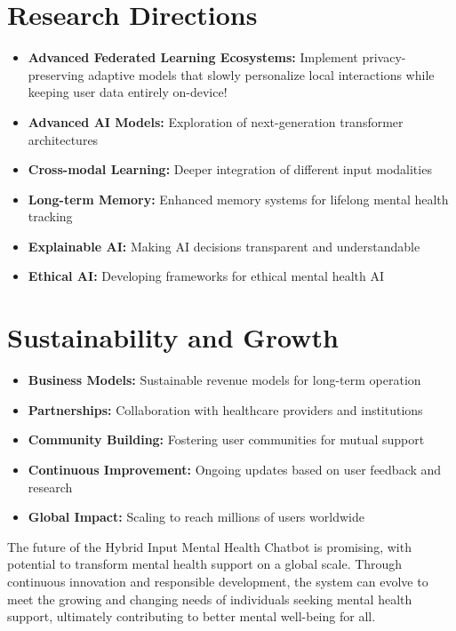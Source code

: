 \documentclass[11pt]{report}
\begin{document}
\section{Research Directions}
\begin{itemize}
    \item \textbf{Advanced Federated Learning Ecosystems:} Implement privacy-preserving adaptive models that slowly personalize local interactions while keeping user data entirely on-device!
    \item \textbf{Advanced AI Models:} Exploration of next-generation transformer architectures
    \item \textbf{Cross-modal Learning:} Deeper integration of different input modalities
    \item \textbf{Long-term Memory:} Enhanced memory systems for lifelong mental health tracking
    \item \textbf{Explainable AI:} Making AI decisions transparent and understandable
    \item \textbf{Ethical AI:} Developing frameworks for ethical mental health AI
\end{itemize}

\section{Sustainability and Growth}
\begin{itemize}
    \item \textbf{Business Models:} Sustainable revenue models for long-term operation
    \item \textbf{Partnerships:} Collaboration with healthcare providers and institutions
    \item \textbf{Community Building:} Fostering user communities for mutual support
    \item \textbf{Continuous Improvement:} Ongoing updates based on user feedback and research
    \item \textbf{Global Impact:} Scaling to reach millions of users worldwide
\end{itemize}

The future of the Hybrid Input Mental Health Chatbot is promising, with potential to transform mental health support on a global scale. Through continuous innovation and responsible development, the system can evolve to meet the growing and changing needs of individuals seeking mental health support, ultimately contributing to better mental well-being for all.
\end{document}
